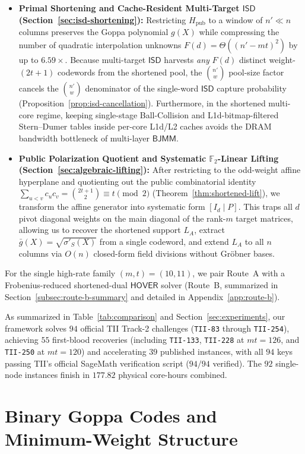 \documentclass[11pt,a4paper]{article}
\theoremstyle{definition}
\theoremstyle{remark}
\newcommand{\F}{\mathbb{F}}
\newcommand{\ISD}{\mathsf{ISD}}
\newcommand{\BJMM}{\mathsf{BJMM}}
\newcommand{\HOVER}{\mathsf{HOVER}}
\begin{document}
\begin{itemize}[leftmargin=1.5em]
    \item \textbf{Primal Shortening and Cache-Resident Multi-Target $\ISD$ (Section~\ref{sec:isd-shortening}):}
    Restricting $H_{\text{pub}}$ to a window of $n' \ll n$ columns preserves the Goppa polynomial $g(X)$ while compressing the number of quadratic interpolation unknowns $F(d) = \Theta((n' - mt)^2)$ by up to $6.59\times$. Because multi-target $\ISD$ harvests \emph{any} $F(d)$ distinct weight-$(2t+1)$ codewords from the shortened pool, the $\binom{n'}{w}$ pool-size factor cancels the $\binom{n'}{w}$ denominator of the single-word $\ISD$ capture probability (Proposition~\ref{prop:isd-cancellation}). Furthermore, in the shortened multi-core regime, keeping single-stage Ball-Collision and L1d-bitmap-filtered Stern--Dumer tables inside per-core L1d/L2 caches avoids the DRAM bandwidth bottleneck of multi-layer $\BJMM$.
    \item \textbf{Public Polarization Quotient and Systematic $\F_2$-Linear Lifting (Section~\ref{sec:algebraic-lifting}):}
    After restricting to the odd-weight affine hyperplane and quotienting out the public combinatorial identity $\sum_{u<v} c_u c_v = \binom{2t+1}{2} \equiv t \pmod 2$ (Theorem~\ref{thm:shortened-lift}), we transform the affine generator into systematic form $[I_d \mid P]$. This traps all $d$ pivot diagonal weights on the main diagonal of the rank-$m$ target matrices, allowing us to recover the shortened support $L_A$, extract $\bar{g}(X) = \sqrt{\sigma'_S(X)}$ from a single codeword, and extend $L_A$ to all $n$ columns via $O(n)$ closed-form field divisions without Gröbner bases.
\end{itemize}
For the single high-rate family $(m,t)=(10,11)$, we pair Route~A with a Frobenius-reduced shortened-dual $\HOVER$ solver (Route~B, summarized in Section~\ref{subsec:route-b-summary} and detailed in Appendix~\ref{app:route-b}).

As summarized in Table~\ref{tab:comparison} and Section~\ref{sec:experiments}, our framework solves $94$ official TII Track-2 challenges (\texttt{TII-83} through \texttt{TII-254}), achieving $55$ first-blood recoveries (including \texttt{TII-133}, \texttt{TII-228} at $mt=126$, and \texttt{TII-250} at $mt=120$) and accelerating $39$ published instances, with all $94$ keys passing TII's official SageMath verification script ($94/94$ verified). The $92$ single-node instances finish in $177.82$ physical core-hours combined.

\section{Binary Goppa Codes and Minimum-Weight Structure}
\label{sec:prelim}
\end{document}
